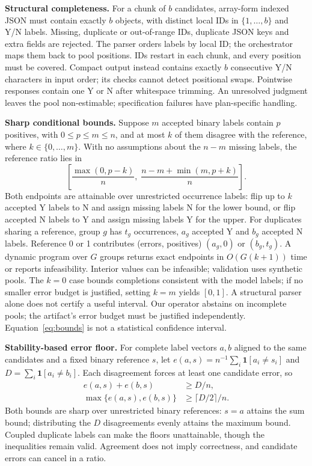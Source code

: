 \documentclass[conference]{IEEEtran}
\newcommand{\indicator}{\mathbf{1}}
\begin{document}
\textbf{Structural completeness.} For a chunk of $b$ candidates, array-form indexed JSON must contain exactly $b$ objects, with distinct local IDs in $\{1,\ldots,b\}$ and Y/N labels. Missing, duplicate or out-of-range IDs, duplicate JSON keys and extra fields are rejected. The parser orders labels by local ID; the orchestrator maps them back to pool positions. IDs restart in each chunk, and every position must be covered. Compact output instead contains exactly $b$ consecutive Y/N characters in input order; its checks cannot detect positional swaps. Pointwise responses contain one Y or N after whitespace trimming. An unresolved judgment leaves the pool non-estimable; specification failures have plan-specific handling.

\textbf{Sharp conditional bounds.} Suppose $m$ accepted binary labels contain $p$ positives, with $0\leq p\leq m\leq n$, and at most $k$ of them disagree with the reference, where $k\in\{0,\ldots,m\}$. With no assumptions about the $n-m$ missing labels, the reference ratio lies in
\begin{equation}
\left[\frac{\max(0,p-k)}{n},\;\frac{n-m+\min(m,p+k)}{n}\right].
\label{eq:bounds}
\end{equation}
Both endpoints are attainable over unrestricted occurrence labels: flip up to $k$ accepted Y labels to N and assign missing labels N for the lower bound, or flip accepted N labels to Y and assign missing labels Y for the upper. For duplicates sharing a reference, group $g$ has $t_g$ occurrences, $a_g$ accepted Y and $b_g$ accepted N labels. Reference 0 or 1 contributes (errors, positives) $(a_g,0)$ or $(b_g,t_g)$. A dynamic program over $G$ groups returns exact endpoints in $O(G(k+1))$ time or reports infeasibility. Interior values can be infeasible; validation uses synthetic pools. The $k=0$ case bounds completions consistent with the model labels; if no smaller error budget is justified, setting $k=m$ yields $[0,1]$. A structural parser alone does not certify a useful interval. Our operator abstains on incomplete pools; the artifact's error budget must be justified independently. Equation~\eqref{eq:bounds} is not a statistical confidence interval.

\textbf{Stability-based error floor.} For complete label vectors $a,b$ aligned to the same candidates and a fixed binary reference $s$, let $e(a,s)=n^{-1}\sum_i\indicator[a_i\ne s_i]$ and $D=\sum_i\indicator[a_i\ne b_i]$. Each disagreement forces at least one candidate error, so
\begin{equation}
\begin{aligned}
e(a,s)+e(b,s)&\ge D/n,\\
\max\{e(a,s),e(b,s)\}&\ge \lceil D/2\rceil/n.
\end{aligned}
\label{eq:stability}
\end{equation}
Both bounds are sharp over unrestricted binary references: $s=a$ attains the sum bound; distributing the $D$ disagreements evenly attains the maximum bound. Coupled duplicate labels can make the floors unattainable, though the inequalities remain valid. Agreement does not imply correctness, and candidate errors can cancel in a ratio.
\end{document}
